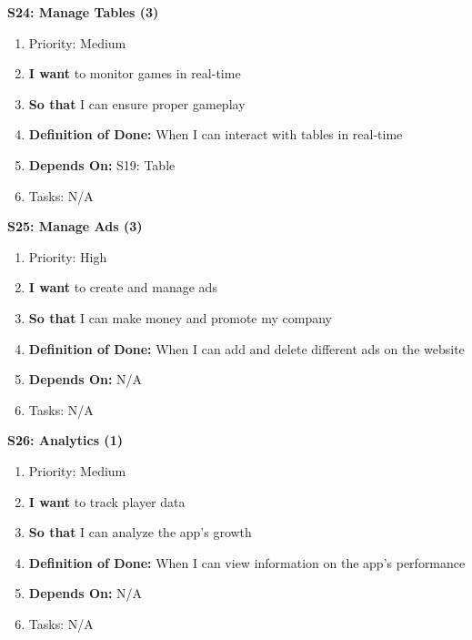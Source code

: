 \textbf{S24: Manage Tables (3)}
\begin{enumerate}
    \item Priority: Medium
    \item \textbf{I want} to monitor games in real-time
    \item \textbf{So that} I can ensure proper gameplay
    \item \textbf{Definition of Done:} When I can interact with tables in real-time
    \item \textbf{Depends On:} S19: Table
    \item Tasks: N/A
\end{enumerate}


\textbf{S25: Manage Ads (3)}
\begin{enumerate}
    \item Priority: High
    \item \textbf{I want} to create and manage ads
    \item \textbf{So that} I can make money and promote my company
    \item \textbf{Definition of Done:} When I can add and delete different ads on the website
    \item \textbf{Depends On:} N/A
    \item Tasks: N/A
\end{enumerate}


\textbf{S26: Analytics (1)}
\begin{enumerate}
    \item Priority: Medium
    \item \textbf{I want} to track player data
    \item \textbf{So that} I can analyze the app's growth
    \item \textbf{Definition of Done:} When I can view information on the app's performance
    \item \textbf{Depends On:} N/A
    \item Tasks: N/A
\end{enumerate}


